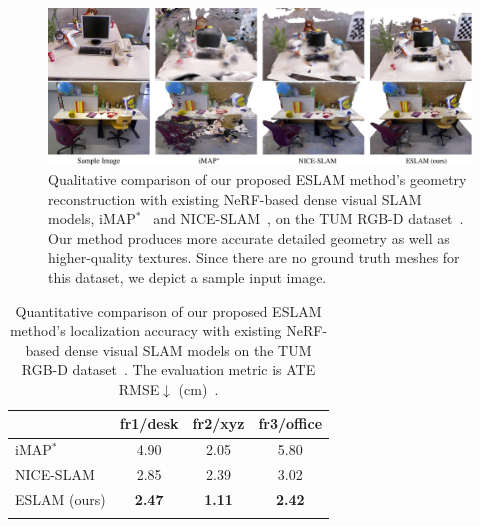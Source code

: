 \begin{figure}[t]
    \begin{center}
        \includegraphics[width=1.0\linewidth]{images/chapter4/figures/Fig6.jpg}
    \end{center}
    \vspace{-3ex}
    \caption{Qualitative comparison of our proposed ESLAM method's geometry reconstruction with existing NeRF-based dense visual SLAM models, iMAP$^*$~\cite{sucar2021imap} and NICE-SLAM~\cite{zhu2022nice}, on the TUM RGB-D dataset~\cite{sturm2012benchmark}. Our method produces more accurate detailed geometry as well as higher-quality textures. Since there are no ground truth meshes for this dataset, we depict a sample input image.}
    \label{fig:c4_qualitative_tum}
\end{figure}

\begin{table}[!t]
    \begin{center}
        \begin{tabular}{l|ccc}
            \Xhline{2\arrayrulewidth}
            & fr1/desk & fr2/xyz & fr3/office \\

            \hline
            iMAP$^{*}$~\cite{sucar2021imap} & 4.90 & 2.05 & 5.80 \\
            NICE-SLAM~\cite{zhu2022nice} & 2.85 & 2.39 & 3.02 \\
            ESLAM (ours) & \textbf{2.47} & \textbf{1.11} & \textbf{2.42} \\ 
            
            \Xhline{2\arrayrulewidth}
        \end{tabular}
    \end{center}
    \caption{Quantitative comparison of our proposed ESLAM method's localization accuracy with existing NeRF-based dense visual SLAM models on the TUM RGB-D dataset~\cite{sturm2012benchmark}. The evaluation metric is ATE RMSE$\downarrow$ (cm)~\cite{sturm2012benchmark}.}
    \label{table:tum}
\end{table}

